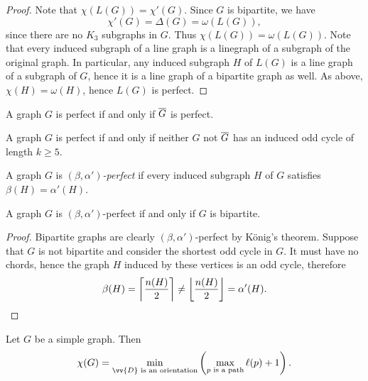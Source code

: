 \begin{proof}
Note that $\chi(L(G)) = \chi'(G)$. Since $G$ is bipartite, we have
\[
\chi'(G) = \Delta(G) = \omega(L(G)),
\]
since there are no $K_3$ subgraphs in $G$. Thus
$\chi(L(G)) = \omega(L(G))$. Note that every induced subgraph of a
line graph is a linegraph of a subgraph of the original graph. In
particular, any induced subgraph $H$ of $L(G)$ is a line graph of a
subgraph of $G$, hence it is a line graph of a bipartite graph as
well. As above, $\chi(H) = \omega(H)$, hence $L(G)$ is perfect.
\end{proof}

\begin{izrek}
A graph $G$ is perfect if and only if $\overline{G}$ is perfect.
\end{izrek}

\begin{izrek}
A graph $G$ is perfect if and only if neither $G$ not $\overline{G}$
has an induced odd cycle of length $k \geq 5$.
\end{izrek}

\begin{definicija}
A graph $G$ is
\emph{$(\beta, \alpha')$-perfect}
if every induced subgraph $H$ of $G$ satisfies
$\beta(H) = \alpha'(H)$.
\end{definicija}

\begin{izrek}
A graph $G$ is $(\beta, \alpha')$-perfect if and only if $G$ is
bipartite.
\end{izrek}

\begin{proof}
Bipartite graphs are clearly $(\beta, \alpha')$-perfect by König's
theorem. Suppose that $G$ is not bipartite and consider the
shortest odd cycle in $G$. It must have no chords, hence the graph
$H$ induced by these vertices is an odd cycle, therefore
\[
\beta(H) =
\left\lceil \frac{n(H)}{2}\right\rceil \ne
\left\lfloor \frac{n(H)}{2}\right\rfloor =
\alpha'(H). \qedhere
\]
\end{proof}

\begin{izrek}
Let $G$ be a simple graph. Then
\[
\chi(G) =
\min_{\text{$\vv{D}$ is an orientation}}
\br{\max_{\text{$p$ is a path}} \ell(p)+1}.
\]
\end{izrek}

